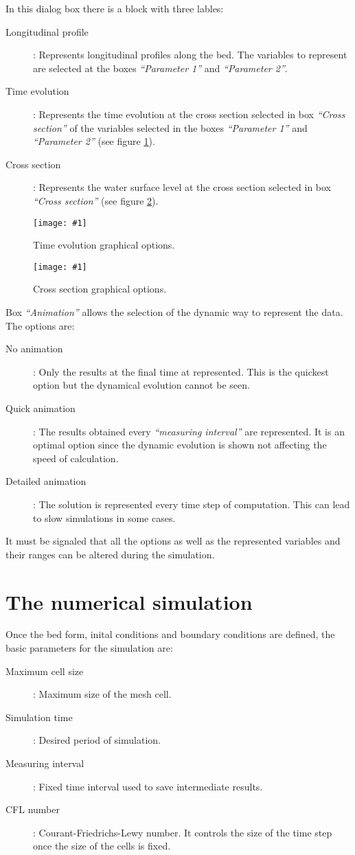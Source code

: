 \documentclass[a4paper,12pt]{article}
\newcommand{\fig}[3]
{
	\begin{figure}[ht!]
		\centering
		\texttt{[image: \#1]}
		\caption{#2.\label{#3}}
	\end{figure}
}
\newcommand{\IT}[1]{{\sl ``#1''}}
\begin{document}
In this dialog box there is a block with three lables:
\begin{description}
\item[Longitudinal profile]: Represents longitudinal profiles along the
bed. The variables to represent are selected at the boxes \IT{Parameter 1} and
\IT{Parameter 2}.
\item[Time evolution]: Represents the time evolution at the cross section
selected in box \IT{Cross section} of the variables selected in the boxes
\IT{Parameter 1} and \IT{Parameter 2} (see figure \ref{FigOpcionesB}).
\item[Cross section]: Represents the water surface level at the cross
section selected in box \IT{Cross section} (see figure \ref{FigOpcionesC}).
\end{description}
\fig{Options2.ps}{Time evolution graphical options}{FigOpcionesB}
\fig{Options3.ps}{Cross section graphical options}{FigOpcionesC}

Box \IT{Animation} allows the selection of the dynamic way to represent the
data. The options are:
\begin{description}
\item[No animation]: Only the results at the final time at represented. This is
the quickest option but the dynamical evolution cannot be seen.
\item[Quick animation]: The results obtained every \IT{measuring interval} are
represented. It is an optimal option since the dynamic evolution is shown not
affecting the speed of calculation.
\item[Detailed animation]: The solution is represented every time step of
computation. This can lead to slow simulations in some cases.
\end{description}

It must be signaled that all the options as well as the represented variables
and their ranges can be altered during the simulation.

\section{The numerical simulation}

Once the bed form, inital conditions and boundary conditions are defined, the
basic parameters for the simulation are:
\begin{description}
\item[Maximum cell size]: Maximum size of the mesh cell.
\item[Simulation time]: Desired period of simulation.
\item[Measuring interval]: Fixed time interval used to save intermediate
results.
\item[CFL number]: Courant-Friedrichs-Lewy number. It controls the size of the
time step once the size of the cells is fixed.
\end{description}
\end{document}
